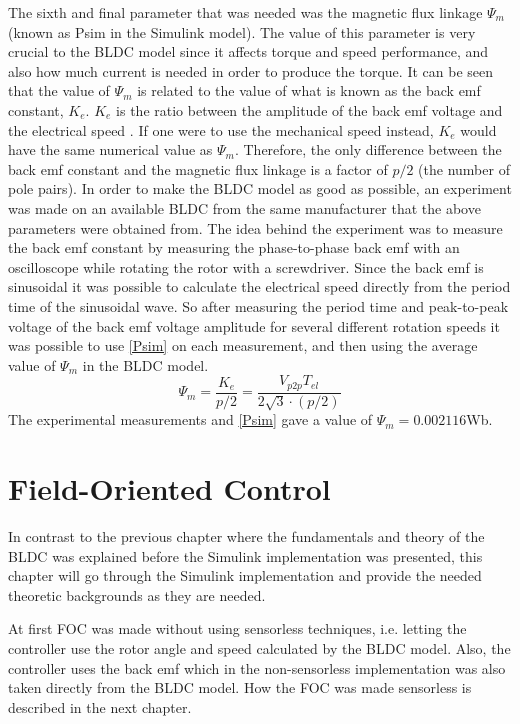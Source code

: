 \documentclass{LTHthesis}
\begin{document}
The sixth and final parameter that was needed was the magnetic flux linkage $\Psi_{m}$ (known as Psim in the Simulink model). The value of this parameter is very crucial to the BLDC model since it affects torque and speed performance, and also how much current is needed in order to produce the torque. It can be seen that the value of $\Psi_{m}$ is related to the value of what is known as the back emf constant, $K_{e}$. $K_{e}$ is the ratio between the amplitude of the back emf voltage and the electrical speed \cite{bob2013}. If one  were to use the mechanical speed instead, $K_{e}$ would have the same numerical value as $\Psi_{m}$. Therefore, the only difference between the back emf constant and the magnetic flux linkage is a factor of $p/2$ (the number of pole pairs). In order to make the BLDC model as good as possible, an experiment was made on an available BLDC from the same manufacturer that the above parameters were obtained from. The idea behind the experiment was to measure the back emf constant by measuring the phase-to-phase back emf with an oscilloscope while rotating the rotor with a screwdriver. Since the back emf is sinusoidal it was possible to calculate the electrical speed directly from the period time of the sinusoidal wave. So after measuring the period time and peak-to-peak voltage of the back emf voltage amplitude for several different rotation speeds it was possible to use \eqref{Psim} on each measurement, and then using the average value of $\Psi_{m}$ in the BLDC model.
\begin{equation} \label{Psim}
\Psi_{m}=\frac{K_{e}}{p/2}=\frac{V_{p2p}T_{el}}{2\sqrt{3}\cdot(p/2)}
\end{equation}
The experimental measurements and \eqref{Psim} gave a value of $\Psi_m=0.002116$Wb.


\chapter{Field-Oriented Control}
In contrast to the previous chapter where the fundamentals and theory of the BLDC was explained before the Simulink implementation was presented, this chapter will go through the Simulink implementation and provide the needed theoretic backgrounds as they are needed. 

At first FOC was made without using sensorless techniques, i.e. letting the controller use the rotor angle and speed calculated by the BLDC model. Also, the controller uses the back emf which in the non-sensorless implementation was also taken directly from the BLDC model. How the FOC was made sensorless is described in the next chapter.
\end{document}
